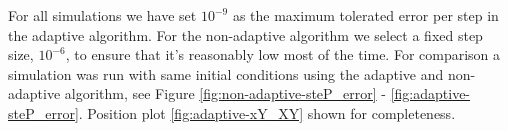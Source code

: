For all simulations we have set $10^{-9}$ as the maximum tolerated error per step in the adaptive algorithm. For the non-adaptive algorithm we select a fixed step size, $10^{-6}$, to ensure that it's reasonably low most of the time. For comparison a simulation was run with same initial conditions using the adaptive and non-adaptive algorithm, see Figure \ref{fig:non-adaptive-steP_error} - \ref{fig:adaptive-steP_error}. Position plot \ref{fig:adaptive-xY_XY} shown for completeness.

\begin{figure}
    \centering
\end{figure}

